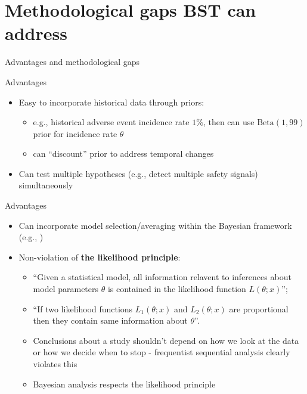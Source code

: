 \documentclass[xcolor=dvipsnames]{beamer}
\begin{document}
\section{Methodological gaps BST can address}

\begin{frame}
    \Huge{\centerline{Advantages and methodological gaps}}
\end{frame}  

\begin{frame}{Advantages}
\begin{itemize}
    \item Easy to incorporate historical data through priors:
    \begin{itemize}
        \item e.g., historical adverse event incidence rate $1\%$, then can use $\text{Beta}(1,99)$ prior for incidence rate $\theta$
        \item can ``discount'' prior to address temporal changes \cite{west2006bayesian}
    \end{itemize}
    \pause
    \item Can test multiple hypotheses (e.g., detect multiple safety signals) simultaneously \cite{gopalan1998bayesian,berry1999bayesian,scott2006exploration,labbe2007multiple,guo2010multiplicity,kachiashvili2012sensitivity,kachiashvili2013conditional,kachiashvili2014methods,berger2013statistical}
\end{itemize}
    
\end{frame}

\begin{frame}{Advantages}
\begin{itemize}
    \item Can incorporate model selection/averaging within the Bayesian framework (e.g., \cite{raftery1995bayesian,wasserman2000bayesian,chipman2001practical,stephan2009bayesian,wathen2008bayesian,senarathne2020laplace})
    \item Non-violation of \textbf{the likelihood principle}:
    \begin{itemize}
        \item ``Given a statistical model, all information relavent to inferences about model parameters $\theta$ is contained in the likelihood function $L(\theta ; x)$'';
        \item ``If two likelihood functions $L_1(\theta ; x)$ and $L_2(\theta ; x)$ are proportional then they contain same information about $\theta$''.
        \item Conclusions about a study shouldn't depend on how we look at the data or how we decide when to stop - frequentist sequential analysis clearly violates this
        \item Bayesian analysis respects the likelihood principle
    \end{itemize}
\end{itemize}
    
\end{frame}
\end{document}
